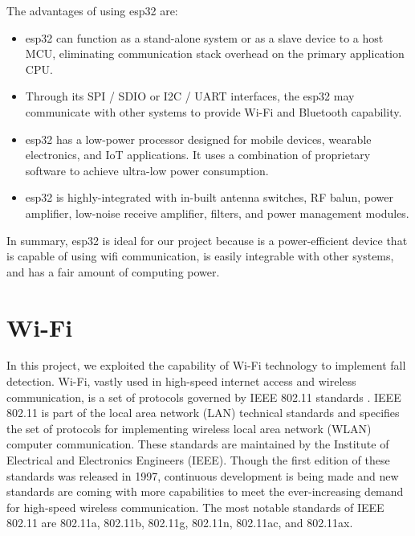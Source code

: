The advantages of using esp32 are:
\begin{itemize}
\item esp32 can function as a stand-alone system or as a slave device to a host MCU, eliminating communication stack overhead on the primary application CPU.
\item Through its SPI / SDIO or I2C / UART interfaces, the esp32 may communicate with other systems to provide Wi-Fi and Bluetooth capability.
\item esp32 has a low-power processor designed for mobile devices, wearable electronics, and IoT applications. It uses a combination of proprietary software to achieve ultra-low power consumption.
\item esp32 is highly-integrated with in-built antenna switches, RF balun, power amplifier, low-noise receive amplifier, filters, and power management modules.
\end{itemize}

In summary, esp32 is ideal for our project because is a power-efficient device that is capable of using wifi communication, is easily integrable with other systems, and has a fair amount of computing power.


\section{Wi-Fi}
In this project, we exploited the capability of Wi-Fi technology to implement fall detection. Wi-Fi, vastly used in high-speed internet access and wireless communication, is a set of protocols governed by IEEE 802.11 standards \cite{7786995}. IEEE 802.11 is part of the local area network (LAN) technical standards and specifies the set of protocols for implementing wireless local area network (WLAN) computer communication. These standards are maintained by the Institute of Electrical and Electronics Engineers (IEEE). Though the first edition of these standards was released in 1997, continuous development is being made and new standards are coming with more capabilities to meet the ever-increasing demand for high-speed wireless communication. The most notable standards of IEEE 802.11 are 802.11a, 802.11b, 802.11g, 802.11n, 802.11ac, and 802.11ax.

